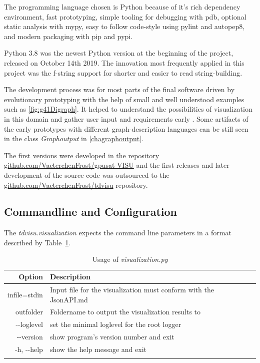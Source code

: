 \documentclass[a4paper, 12pt, bibliography=totoc]{scrartcl}
\begin{document}
The programming language chosen is Python because of it's rich dependency environment, fast prototyping, simple tooling for debugging with pdb, optional static analysis with mypy, easy to follow code-style using pylint and autopep8, and modern packaging with pip and pypi.

Python 3.8 was the newest Python version at the beginning of the project, released on October 14th 2019. The innovation most frequently applied in this project was the f-string support for shorter and easier to read string-building. %

The development process was for most parts of the final software driven by evolutionary prototyping with the help of small and well understood examples such as \ref{fig:g41Digraph}. It helped to understand the possibilities of visualization in this domain and gather user input and requirements early \cite{rapidPrototypingOvermyer}. Some artifacts of the early prototypes with different graph-description languages can be still seen in the class \textit{Graphoutput} in \ref{chagraphoutput}.

The first versions were developed in the repository \url{github.com/VaeterchenFrost/gpusat-VISU} and the first releases and later development of the source code was outsourced to the \url{github.com/VaeterchenFrost/tdvisu} repository.


\subsection{Commandline and Configuration}

The \textit{tdvisu.visualization} expects the command line parameters in a format described by Table~\ref{tab:optionstdvisu}.

\def\arraystretch{1.2}%

\begin{longtable}{|r|p{10cm}|}
	\hline
	Option & Description\\
	\hline\hline
	\endhead

	infile=stdin &  Input file for the visualization must conform with the JsonAPI.md\\
	outfolder &  Foldername to output the visualization results to\\
	-{}-loglevel  &   set the minimal loglevel for the root logger\\
	-{}-version & show program's version number and exit\\
	-h, -{}-help & show the help message and exit\\
	\hline\hline
	\caption{Usage of \textit{visualization.py}
		\label{tab:optionstdvisu}}
\end{longtable}
\end{document}
